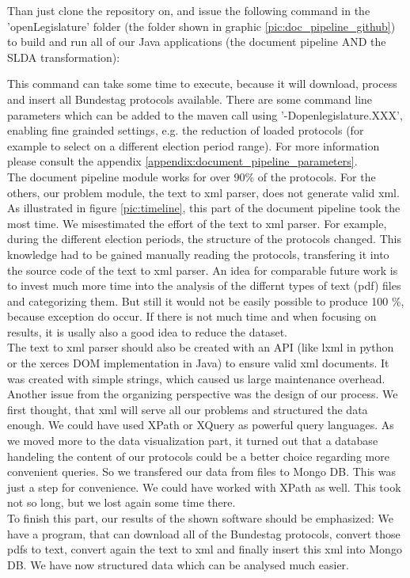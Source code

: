 \documentclass[12pt,paper=a4,nenglish]{scrreprt}
\begin{document}
Than just clone the repository on, and issue the following command in the
'openLegislature' folder (the folder shown in graphic
\ref{pic:doc_pipeline_github}) to build and run all of our Java applications
(the document pipeline AND the SLDA transformation):
\begin{description}
	 \label{listing:maven_build_comman.}%
\end{description}
This command can take some time to execute, because it will download, process
and insert all Bundestag protocols available. There are some command line
parameters which can be added to the maven call using '-Dopenlegislature.XXX',
enabling fine grainded settings, e.g. the reduction of loaded protocols (for example
to select on a different election period range). For more information please consult the appendix
\ref{appendix:document_pipeline_parameters}. \\
 
The document pipeline module works for over 90\% of the protocols. For the
others, our problem module, the text to xml parser, does not generate valid xml.
As illustrated in figure \ref{pic:timeline}, this part of the document pipeline
took the most time. We misestimated the effort of the text to xml parser. For
example, during the different election periods, the structure of the
protocols changed. This knowledge had to be gained manually reading the
protocols, transfering it into the source code of the text to xml parser. An
idea for comparable future work is to invest much more time into the analysis of
the differnt types of text (pdf) files and categorizing them. But still it would
not be easily possible to produce 100 \%, because exception do occur.  
If there is not much time and when focusing on
results, it is usally also a good idea to reduce the dataset.\\ 
The text to xml parser should also be created with an API (like
lxml in python or the xerces DOM implementation in Java) to ensure valid xml documents. It was created with simple strings, which caused us large maintenance overhead. \\
Another issue from the organizing perspective was the design of our process. We
first thought, that xml will serve all our problems and structured the data
enough. We could have used XPath or XQuery as powerful query languages. As we
moved more to the data visualization part, it turned out that a database
handeling the content of our protocols could be a better choice regarding
more convenient queries. So we transfered our data from files to Mongo DB. This
was just a step for convenience. We could have worked with XPath as well. This took not so long,
but we lost again some time there.\\
To finish this part, our results of the shown software should be emphasized: We
have a program, that can download all of the Bundestag protocols, convert those
pdfs to text, convert again the text to xml and finally insert this xml into Mongo DB. 
We have now structured data which can be analysed much easier. 
\end{document}
